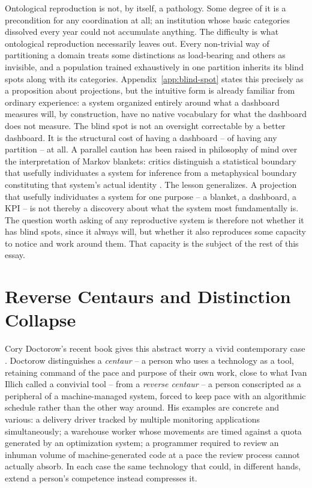 \documentclass[11pt]{article}
\theoremstyle{plain}
\begin{document}
Ontological reproduction is not, by itself, a pathology. Some degree of it is a precondition for any coordination at all; an institution whose basic categories dissolved every year could not accumulate anything. The difficulty is what ontological reproduction necessarily leaves out. Every non-trivial way of partitioning a domain treats some distinctions as load-bearing and others as invisible, and a population trained exhaustively in one partition inherits its blind spots along with its categories. Appendix~\ref{app:blind-spot} states this precisely as a proposition about projections, but the intuitive form is already familiar from ordinary experience: a system organized entirely around what a dashboard measures will, by construction, have no native vocabulary for what the dashboard does not measure. The blind spot is not an oversight correctable by a better dashboard. It is the structural cost of having a dashboard -- of having any partition -- at all. A parallel caution has been raised in philosophy of mind over the interpretation of Markov blankets: critics distinguish a statistical boundary that usefully individuates a system for inference from a metaphysical boundary constituting that system's actual identity \cite{pearl1988,friston2010,bruineberg2022}. The lesson generalizes. A projection that usefully individuates a system for one purpose -- a blanket, a dashboard, a KPI -- is not thereby a discovery about what the system most fundamentally is. The question worth asking of any reproductive system is therefore not whether it has blind spots, since it always will, but whether it also reproduces some capacity to notice and work around them. That capacity is the subject of the rest of this essay.

\section{Reverse Centaurs and Distinction Collapse}
\label{sec:reverse-centaurs}

Cory Doctorow's recent book gives this abstract worry a vivid contemporary case \cite{doctorow2026}. Doctorow distinguishes a \emph{centaur} -- a person who uses a technology as a tool, retaining command of the pace and purpose of their own work, close to what Ivan Illich called a convivial tool \cite{illich1973} -- from a \emph{reverse centaur} -- a person conscripted as a peripheral of a machine-managed system, forced to keep pace with an algorithmic schedule rather than the other way around. His examples are concrete and various: a delivery driver tracked by multiple monitoring applications simultaneously; a warehouse worker whose movements are timed against a quota generated by an optimization system; a programmer required to review an inhuman volume of machine-generated code at a pace the review process cannot actually absorb. In each case the same technology that could, in different hands, extend a person's competence instead compresses it.
\end{document}
